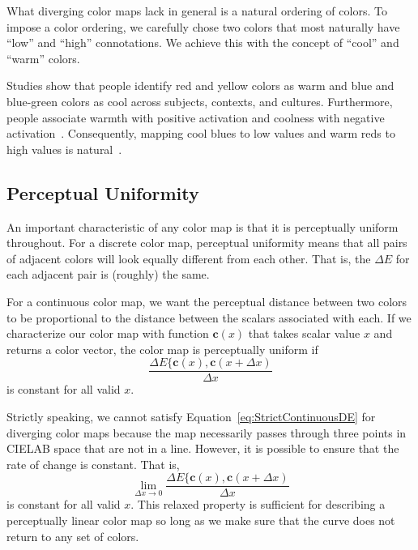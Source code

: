 \documentclass{acmsiggraph}               %
\newcommand{\lcite}[1]{~\cite{#1}}
\newcommand{\Lab}{CIELAB\xspace}
\newcommand{\DeltaE}{\ensuremath{\Delta{}E}\xspace}
\newcommand*{\cvec}[1]{\mathbf{#1}}
\begin{document}
What diverging color maps lack in general is a natural ordering of colors.
To impose a color ordering, we carefully chose two colors that most
naturally have ``low'' and ``high'' connotations.  We achieve this with the
concept of ``cool'' and ``warm'' colors.

Studies show that people identify red and yellow colors as warm and blue and
blue-green colors as cool across subjects, contexts, and
cultures.  Furthermore, people associate warmth with positive activation
and coolness with negative activation\lcite{Hardin97}.  Consequently,
mapping cool blues to low values and warm reds to high values is
natural\lcite{Fortner97}.


\subsection{Perceptual Uniformity}
\label{sec:PerceptualUniformity}

An important characteristic of any color map is that it is perceptually
uniform throughout.  For a discrete color map, perceptual uniformity means
that all pairs of adjacent colors will look equally different from each
other.  That is, the \DeltaE for each adjacent pair is (roughly) the same.

For a continuous color map, we want the perceptual distance between two
colors to be proportional to the distance between the scalars associated
with each.    If we characterize our color map with function $\cvec{c}(x)$
that takes scalar value $x$ and returns a color vector, the color map is
perceptually uniform if
\begin{equation}
  \frac{\DeltaE\{\cvec{c}(x),\cvec{c}(x+\Delta{x})}{\Delta{}x}
  \label{eq:StrictContinuousDE}
\end{equation}
is constant for all valid $x$.

Strictly speaking, we cannot satisfy Equation~\ref{eq:StrictContinuousDE}
for diverging color maps because the map necessarily passes through three
points in \Lab space that are not in a line.  However, it is possible to
ensure that the rate of change is constant.  That is,
\begin{equation}
  \lim_{\Delta{}x \rightarrow 0}{
    \frac{\DeltaE\{\cvec{c}(x),\cvec{c}(x+\Delta{x})}{\Delta{}x} }
  \label{eq:ContinuousDE}
\end{equation}
is constant for all valid $x$.  This relaxed property is sufficient for
describing a perceptually linear color map so long as we make sure that the
curve does not return to any set of colors.
\end{document}
